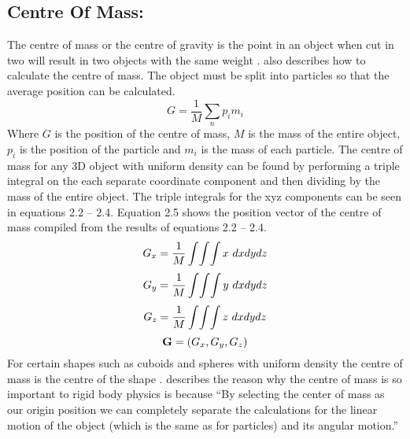 \subsection{Centre Of Mass:}
The centre of mass or the centre of gravity is the point in an object when cut in two will result in two objects with the same weight \citep{millington2007game}. 
\citet{millington2007game} also describes how to calculate the centre of mass.
The object must be split into particles so that the average position can be calculated. 
\begin{equation}\label{Centre of Mass}
   G=\frac{1}{M}\sum _{n}{p}_{i}{m}_{i} 
\end{equation}
Where $G$ is the position of the centre of mass, $M$ is the mass of the entire object, ${p}_{i}$ is the position of the particle and ${m}_{i}$ is the mass of each particle.
The centre of mass for any 3D object with uniform density can be found by performing a triple integral on the each separate coordinate component and then dividing by the mass of the entire object.
The triple integrals for the xyz components can be seen in equations 2.2 – 2.4.
Equation 2.5 shows the position vector of the centre of mass compiled from the results of equations 2.2 – 2.4.
\begin{equation} \label{eq:Centre of Mass x-Component}
	\centering
   G_{x}=\frac{1}{M}\int\!\int\!\int x\ dx dy dz
\end{equation}
\begin{equation} \label{eq:Centre of Mass y-Component}
	\centering
   G_{y}=\frac{1}{M}\int\!\int\!\int y\ dx dy dz
\end{equation}
\begin{equation} \label{eq:Centre of Mass z-Component}
	\centering
   G_{z}=\frac{1}{M}\int\!\int\!\int z\ dx dy dz
\end{equation}
\begin{equation} \label{eq:Centre of Mass Equation}
	\centering
   \mathbf{G}=(G_{x},G_{y},G_{z})
\end{equation}
For certain shapes such as cuboids and spheres with uniform density the centre of mass is the centre of the shape \citep{millington2007game}.
\citet{millington2007game} describes the reason why the centre of mass is so important to rigid body physics is because “By selecting the center of mass as our origin position we can completely separate the calculations for the linear motion of the object (which is the same as for particles) and its angular motion.” 